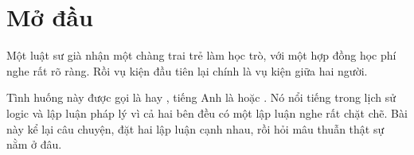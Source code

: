 
\section*{Mở đầu}

Một luật sư già nhận một chàng trai trẻ làm học trò, với một hợp đồng học phí nghe rất rõ ràng. Rồi vụ kiện đầu tiên lại chính là vụ kiện giữa hai người.

Tình huống này được gọi là  hay , tiếng Anh là  hoặc . Nó nổi tiếng trong lịch sử logic và lập luận pháp lý vì cả hai bên đều có một lập luận nghe rất chặt chẽ. Bài này kể lại câu chuyện, đặt hai lập luận cạnh nhau, rồi hỏi mâu thuẫn thật sự nằm ở đâu.

